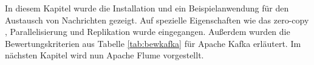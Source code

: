 In diesem Kapitel wurde die Installation und ein Beispielanwendung für den Austausch von Nachrichten gezeigt. Auf spezielle Eigenschaften wie das zero-copy , Parallelisierung und Replikation wurde eingegangen. Außerdem wurden die Bewertungskriterien aus Tabelle \ref{tab:bewkafka} für Apache Kafka erläutert. Im nächsten Kapitel wird nun Apache Flume vorgestellt.


